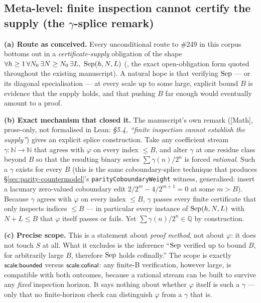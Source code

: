 \documentclass[11pt]{article}
\theoremstyle{plain}
\theoremstyle{definition}
\theoremstyle{remark}
\newcommand{\lean}[2]{\leanlink{#2}}
\let\origmathrm\mathrm
\renewcommand{\mathrm}[1]{\ifmmode\origmathrm{#1}\else\textrm{#1}\fi}%
\newcommand{\ev}[1]{{\small\textsf{[#1]}}\xspace}
\newcommand{\scale}[1]{{\small\textsf{scale:#1}}\xspace}
\begin{document}
\subsection{Meta-level: finite inspection cannot certify the supply (the
\texorpdfstring{\(\gamma\)}{gamma}-splice remark)}

\textbf{(a) Route as conceived.} Every unconditional route to \#249 in this
corpus bottoms out in a \emph{certificate-supply} obligation of the shape
\(\forall h\ge1\,\forall N_0\,\exists N\ge N_0\,\exists L,\ \mathrm{Sep}(h,N,L)\)
(\lean{Erdos249257.irrational\_totient\_series\_iff\_certificate\_supply}{LcmConeFlatness.lean:412}, the exact
open-obligation form quoted throughout the existing manuscript). A natural
hope is that verifying \(\mathrm{Sep}\) — or its diagonal specialisation — at
every scale up to some large, explicit bound \(B\) is evidence that the
supply holds, and that pushing \(B\) far enough would eventually amount to a
proof.

\textbf{(b) Exact mechanism that closed it.} The manuscript's own remark
(\ev{Math}, prose-only, not formalised in Lean:
\emph{\S5.4, ``finite inspection cannot establish the supply''}) gives an
explicit splice construction. Take any coefficient stream \(\gamma:\mathbb
N\to\mathbb N\) that agrees with \(\varphi\) on every index \(\le B\), and
alter \(\gamma\) at one residue class beyond \(B\) so that the resulting
binary series \(\sum\gamma(n)/2^n\) is forced \emph{rational}. Such a
\(\gamma\) exists for every \(B\) (this is the same coboundary-splice
technique that produces \S\ref{sec:parity-countermodel}'s
\texttt{parityCoboundaryWeight} witness, generalised: insert a lacunary
zero-valued coboundary edit \(2/2^m - 4/2^{m+1} = 0\) at some \(m>B\)). Because
\(\gamma\) agrees with \(\varphi\) on every index \(\le B\), \(\gamma\) passes
every finite certificate that only inspects indices \(\le B\) — in
particular every instance of \(\mathrm{Sep}(h,N,L)\) with \(N+L\le B\) that
\(\varphi\) itself passes or fails. Yet \(\sum\gamma(n)/2^n\in\mathbb Q\) by
construction.

\textbf{(c) Precise scope.} This is a statement about \emph{proof method},
not about \(\varphi\): it does not touch \(S\) at all. What it excludes is
the inference ``\(\mathrm{Sep}\) verified up to bound \(B\), for arbitrarily
large \(B\), therefore \(\mathrm{Sep}\) holds cofinally.'' The scope is
exactly \(\scale{bounded}\) versus \(\scale{cofinal}\): any finite-B
verification, however large, is compatible with both outcomes, because a
rational stream can be built to survive any \emph{fixed} inspection horizon.
It says nothing about whether \(\varphi\) itself is such a \(\gamma\) — only
that no finite-horizon check can distinguish \(\varphi\) from a \(\gamma\)
that is.
\end{document}
